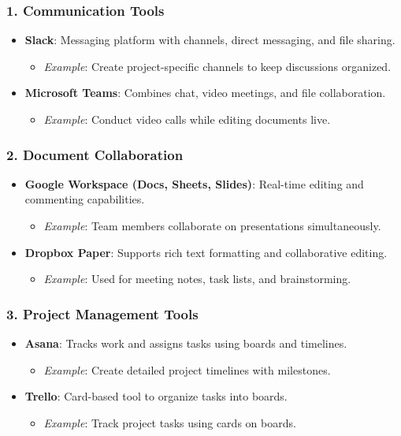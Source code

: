 \documentclass[aspectratio=169]{beamer}
\begin{document}
\begin{frame}[fragile]
    \frametitle{1. Communication Tools}
    \begin{itemize}
        \item \textbf{Slack}: Messaging platform with channels, direct messaging, and file sharing.
        \begin{itemize}
            \item \textit{Example}: Create project-specific channels to keep discussions organized.
        \end{itemize}
        \item \textbf{Microsoft Teams}: Combines chat, video meetings, and file collaboration.
        \begin{itemize}
            \item \textit{Example}: Conduct video calls while editing documents live.
        \end{itemize}
    \end{itemize}
\end{frame}

\begin{frame}[fragile]
    \frametitle{2. Document Collaboration}
    \begin{itemize}
        \item \textbf{Google Workspace (Docs, Sheets, Slides)}: Real-time editing and commenting capabilities.
        \begin{itemize}
            \item \textit{Example}: Team members collaborate on presentations simultaneously.
        \end{itemize}
        \item \textbf{Dropbox Paper}: Supports rich text formatting and collaborative editing.
        \begin{itemize}
            \item \textit{Example}: Used for meeting notes, task lists, and brainstorming.
        \end{itemize}
    \end{itemize}
\end{frame}

\begin{frame}[fragile]
    \frametitle{3. Project Management Tools}
    \begin{itemize}
        \item \textbf{Asana}: Tracks work and assigns tasks using boards and timelines.
        \begin{itemize}
            \item \textit{Example}: Create detailed project timelines with milestones.
        \end{itemize}
        \item \textbf{Trello}: Card-based tool to organize tasks into boards.
        \begin{itemize}
            \item \textit{Example}: Track project tasks using cards on boards.
        \end{itemize}
    \end{itemize}
\end{frame}
\end{document}
